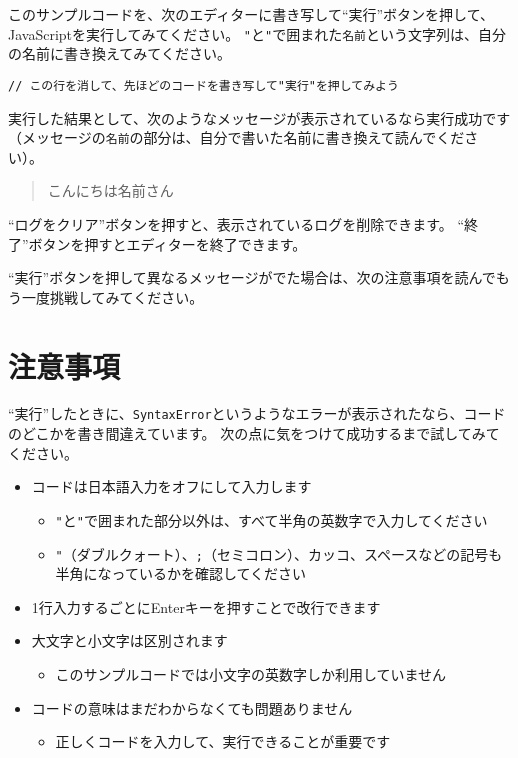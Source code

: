 このサンプルコードを、次のエディターに書き写して``実行''ボタンを押して、JavaScriptを実行してみてください。
\texttt{"}と\texttt{"}で囲まれた\texttt{名前}という文字列は、自分の名前に書き換えてみてください。

\begin{lstlisting}
// この行を消して、先ほどのコードを書き写して"実行"を押してみよう
\end{lstlisting}

実行した結果として、次のようなメッセージが表示されているなら実行成功です
（メッセージの\texttt{名前}の部分は、自分で書いた名前に書き換えて読んでください）。

\begin{quote}
こんにちは名前さん
\end{quote}

``ログをクリア''ボタンを押すと、表示されているログを削除できます。
``終了''ボタンを押すとエディターを終了できます。

``実行''ボタンを押して異なるメッセージがでた場合は、次の注意事項を読んでもう一度挑戦してみてください。

\hypertarget{caution}{%
\section*{注意事項}\label{caution}}

``実行''したときに、\texttt{SyntaxError}というようなエラーが表示されたなら、コードのどこかを書き間違えています。
次の点に気をつけて成功するまで試してみてください。

\begin{itemize}
\item
  コードは日本語入力をオフにして入力します

  \begin{itemize}
  \item
    \texttt{"}と\texttt{"}で囲まれた部分以外は、すべて半角の英数字で入力してください
  \item
    \texttt{"}（ダブルクォート）、\texttt{;}（セミコロン）、カッコ、スペースなどの記号も半角になっているかを確認してください
  \end{itemize}
\item
  1行入力するごとにEnterキーを押すことで改行できます
\item
  大文字と小文字は区別されます

  \begin{itemize}
  \item
    このサンプルコードでは小文字の英数字しか利用していません
  \end{itemize}
\item
  コードの意味はまだわからなくても問題ありません

  \begin{itemize}
  \item
    正しくコードを入力して、実行できることが重要です
  \end{itemize}
\end{itemize}

